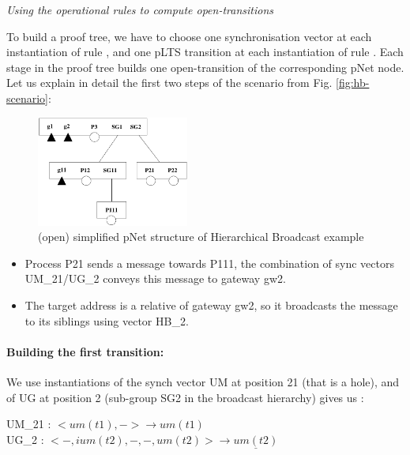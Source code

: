 \documentclass{lncs/llncs}
\newcommand{\TODO}[1]{\textcolor{red}{\textbf{[TODO:#1]}}}
\begin{document}
\begin{example} \emph{Using the operational rules to compute
    open-transitions}
  \label{example:deduction-trees}

To build a proof tree, we have to choose one synchronisation vector at
each instantiation of rule \TrDeux, and one pLTS transition at each
instantiation of rule \TrUn. Each stage in the proof tree builds one
open-transition of the corresponding pNet node.  Let us explain in
detail the first two steps of the
scenario from Fig. \ref{fig:hb-scenario}:

\begin{figure}[h]
\centerline{ \includegraphics[width=5cm]{XFIG/HB2} }
\caption{(open) simplified pNet structure of Hierarchical Broadcast example}
\label{fig:flattening}
\end{figure}

\begin{itemize}
\item Process P21 sends a message towards P111, the combination of sync vectors UM\_21/UG\_2 conveys this message to gateway gw2.
\item The target address is a relative of gateway gw2, so it
  broadcasts the message to its siblings using vector HB\_2.
\end{itemize}
\end{example}


\paragraph{Building the first transition:}

We use instantiations of the synch vector UM at position 21 (that is a
hole), and of UG at position 2 (sub-group SG2 in the broadcast hierarchy) gives us :
\medskip


\noindent
UM\_21 : $< um(t1), - > \to\!um(t1)$\\
UG\_2 : $< -, ium(t2), -, -, um(t2) > \longrightarrow \underline{um(t2)}$
\end{document}
